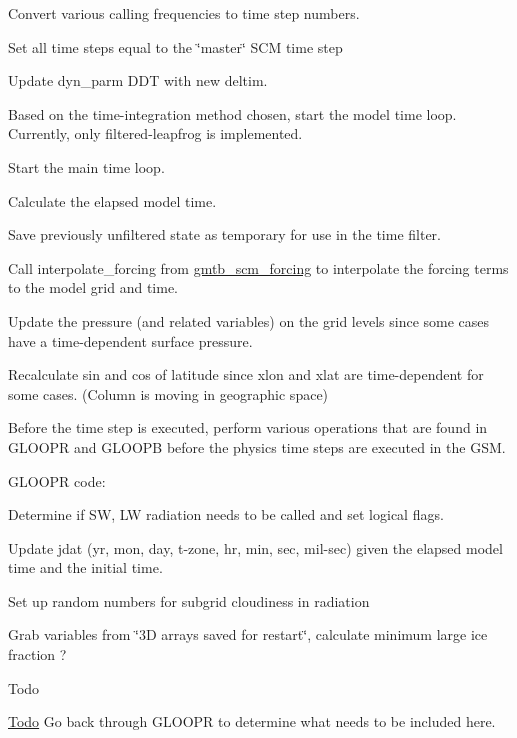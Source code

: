 \begin{DoxyItemize}
\item Convert various calling frequencies to time step numbers.
\item Set all time steps equal to the \char`\"{}master\char`\"{} S\+CM time step
\item Update dyn\+\_\+parm D\+DT with new deltim.
\item Based on the time-\/integration method chosen, start the model time loop. Currently, only filtered-\/leapfrog is implemented.
\item Start the main time loop.
\begin{DoxyItemize}
\item Calculate the elapsed model time.
\item Save previously unfiltered state as temporary for use in the time filter.
\item Call interpolate\+\_\+forcing from \hyperlink{group__forcing}{gmtb\+\_\+scm\+\_\+forcing} to interpolate the forcing terms to the model grid and time.
\item Update the pressure (and related variables) on the grid levels since some cases have a time-\/dependent surface pressure.
\item Recalculate sin and cos of latitude since xlon and xlat are time-\/dependent for some cases. (Column is moving in geographic space)
\item Before the time step is executed, perform various operations that are found in G\+L\+O\+O\+PR and G\+L\+O\+O\+PB before the physics time steps are executed in the G\+SM.
\begin{DoxyItemize}
\item G\+L\+O\+O\+PR code\+:
\begin{DoxyItemize}
\item Determine if SW, LW radiation needs to be called and set logical flags.
\item Update jdat (yr, mon, day, t-\/zone, hr, min, sec, mil-\/sec) given the elapsed model time and the initial time.
\item Set up random numbers for subgrid cloudiness in radiation
\item Grab variables from \char`\"{}3\+D arrays saved for restart\char`\"{}, calculate minimum large ice fraction ?
\item \begin{DoxyRefDesc}{Todo}
\item[\hyperlink{todo__todo000011}{Todo}]Go back through G\+L\+O\+O\+PR to determine what needs to be included here. \end{DoxyRefDesc}


\end{DoxyItemize}
\end{DoxyItemize}
\end{DoxyItemize}
\end{DoxyItemize}

